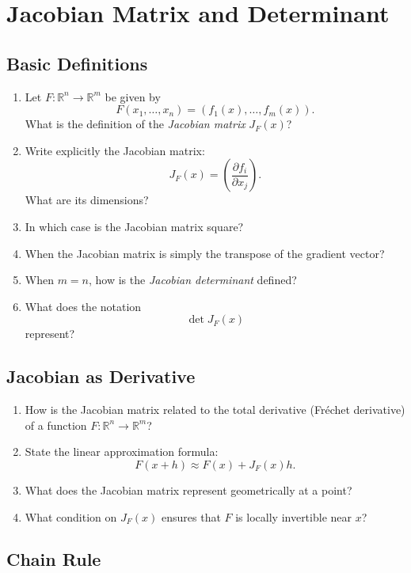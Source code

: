 \section{Jacobian Matrix and Determinant}

\subsection{Basic Definitions}

\begin{enumerate}
  \item Let \(F : \mathbb{R}^{n} \to \mathbb{R}^{m}\) be given by
    \[ F(x_{1},\dots,x_{n}) = (f_{1}(x),\dots,f_{m}(x)). \]
    What is the definition of the \emph{Jacobian matrix} \(J_{F}(x)\)?
  \item Write explicitly the Jacobian matrix:
    \[ J_{F}(x) = \left( \frac{\partial f_{i}}{\partial x_{j}}\right). \]
    What are its dimensions?
  \item In which case is the Jacobian matrix square?
  \item When the Jacobian matrix is simply the transpose of the gradient vector?
  \item When \(m = n\), how is the \emph{Jacobian determinant} defined?
  \item What does the notation
    \[ \det J_{F}(x) \]
    represent?
\end{enumerate}

\subsection{Jacobian as Derivative}

\begin{enumerate}[resume]
  \item How is the Jacobian matrix related to the total derivative (Fréchet derivative) of a function \(F : \mathbb{R}^{n} \to \mathbb{R}^{m}\)?
  \item State the linear approximation formula:
    \[ F(x+h) \approx F(x) + J_{F}(x)h. \]
  \item What does the Jacobian matrix represent geometrically at a point?
  \item What condition on \(J_{F}(x)\) ensures that \(F\) is locally invertible near \(x\)?
\end{enumerate}

\subsection{Chain Rule}

